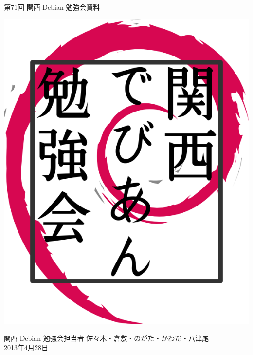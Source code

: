 \documentclass[mingoth,a4paper]{jsarticle}
\newcommand{\debmtgyear}{2013}
\newcommand{\debmtgdate}{28}
\newcommand{\debmtgmonth}{4}
\newcommand{\debmtgnumber}{71}
\begin{document}
\begin{titlepage}


 第\debmtgnumber{}回 関西 Debian 勉強会資料

\vspace{2cm}

\begin{center}
\includegraphics{image200802/kansaidebianlogo.png}
\end{center}

\begin{flushright}
\hfill{}関西 Debian 勉強会担当者 佐々木・倉敷・のがた・かわだ・八津尾 \\
\hfill{}\debmtgyear{}年\debmtgmonth{}月\debmtgdate{}日
\end{flushright}

\thispagestyle{empty}
\end{titlepage}


\vspace{1em}
\end{document}
